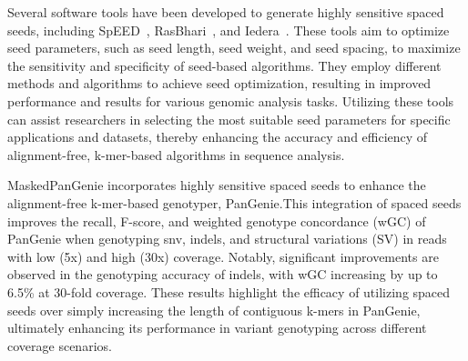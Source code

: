 \documentclass{PHlab-thesis}
\begin{document}
Several software tools have been developed to generate highly sensitive spaced seeds, including SpEED~\cite{Lucian2011SpEED}, RasBhari~\cite{Hahn2016Rasbhari}, and Iedera~\cite{Kucherov2006Sensitivity}. These tools aim to optimize seed parameters, such as seed length, seed weight, and seed spacing, to maximize the sensitivity and specificity of seed-based algorithms. They employ different methods and algorithms to achieve seed optimization, resulting in improved performance and results for various genomic analysis tasks. Utilizing these tools can assist researchers in selecting the most suitable seed parameters for specific applications and datasets, thereby enhancing the accuracy and efficiency of alignment-free, k-mer-based algorithms in sequence analysis.

MaskedPanGenie incorporates highly sensitive spaced seeds to enhance the alignment-free k-mer-based genotyper, PanGenie.This integration of spaced seeds improves the recall, F-score, and weighted genotype concordance (wGC) of PanGenie when genotyping snv, indels, and structural variations (SV) in reads with low (5x) and high (30x) coverage. Notably, significant improvements are observed in the genotyping accuracy of indels, with wGC increasing by up to 6.5\% at 30-fold coverage. These results highlight the efficacy of utilizing spaced seeds over simply increasing the length of contiguous k-mers in PanGenie, ultimately enhancing its performance in variant genotyping across different coverage scenarios.
\end{document}
